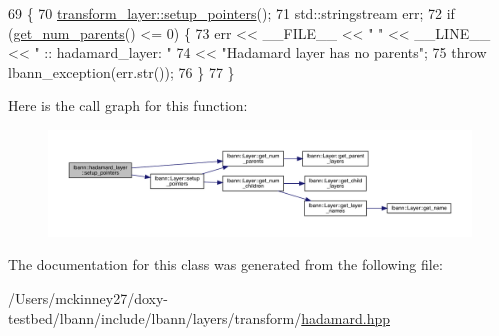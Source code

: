 \begin{DoxyCode}
69                                  \{
70     \hyperlink{classlbann_1_1Layer_a71b7a62afd9b73c23b2c0267b8ba0981}{transform\_layer::setup\_pointers}();
71     std::stringstream err;
72     \textcolor{keywordflow}{if} (\hyperlink{classlbann_1_1Layer_ac9290d4a6453ccda5f6b4d8b57b49ba3}{get\_num\_parents}() <= 0) \{
73       err << \_\_FILE\_\_ << \textcolor{stringliteral}{" "} << \_\_LINE\_\_ << \textcolor{stringliteral}{" :: hadamard\_layer: "}
74           << \textcolor{stringliteral}{"Hadamard layer has no parents"};
75       \textcolor{keywordflow}{throw} lbann\_exception(err.str());
76     \}
77   \}
\end{DoxyCode}
Here is the call graph for this function\+:\nopagebreak
\begin{figure}[H]
\begin{center}
\leavevmode
\includegraphics[width=350pt]{classlbann_1_1hadamard__layer_a712faa83429f6a77a6c43c8afde4ddaa_cgraph}
\end{center}
\end{figure}


The documentation for this class was generated from the following file\+:\begin{DoxyCompactItemize}
\item 
/\+Users/mckinney27/doxy-\/testbed/lbann/include/lbann/layers/transform/\hyperlink{hadamard_8hpp}{hadamard.\+hpp}\end{DoxyCompactItemize}
